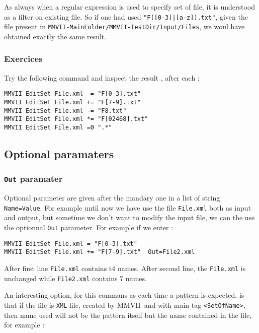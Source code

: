 \documentclass[a4paper]{book}
\newcommand{\PPP}{MMVII}
\newcommand{\MMVIDIR}{{\tt MMVII-MainFolder/}}
\begin{document}
{As always when  a regular expression is used to specify set of file,
it is understood as a filter on existing file. So if one had used {\tt "F([0-3]|[a-z]).txt"},
given the file present in  {\tt {\MMVIDIR}MMVII-TestDir/Input/Files}, we woul have
obtained exactly the same result.

\subsubsection{Exercices}
Try the following command and inspect the result , after each :

\begin{verbatim}
MMVII EditSet File.xml  = "F[0-3].txt"
MMVII EditSet File.xml += "F[7-9].txt"
MMVII EditSet File.xml -= "F8.txt"
MMVII EditSet File.xml *= "F[02468].txt"
MMVII EditSet File.xml =0 ".*"
\end{verbatim}


\subsection{Optional paramaters}

\subsubsection{{\tt Out} paramater}

Optional parameter are given after  the  mandary one in a list of 
string {\tt Name=Value}. For example until now we have use
the file {\tt File.xml} both as input and output, but sometime
we don't want to modify the input file, we can the use the optionnal
{\tt Out} parameter. For example if we enter :

\begin{verbatim}
MMVII EditSet File.xml = "F[0-3].txt" 
MMVII EditSet File.xml += "F[7-9].txt"  Out=File2.xml
\end{verbatim}

After first line {\tt File.xml} contains t$4$ names.
After second line, the  {\tt File.xml} is unchanged
while  {\tt File2.xml} contains $7$ names.


An interesting option, for this commans as each time
a pattern is expected, is that if the file is {\tt XML}
file, created by \PPP\, and with main tag {\tt <SetOfName>},
then name used will not be the pattern itself but the name
contained in the file, for example : 

}
\end{document}

